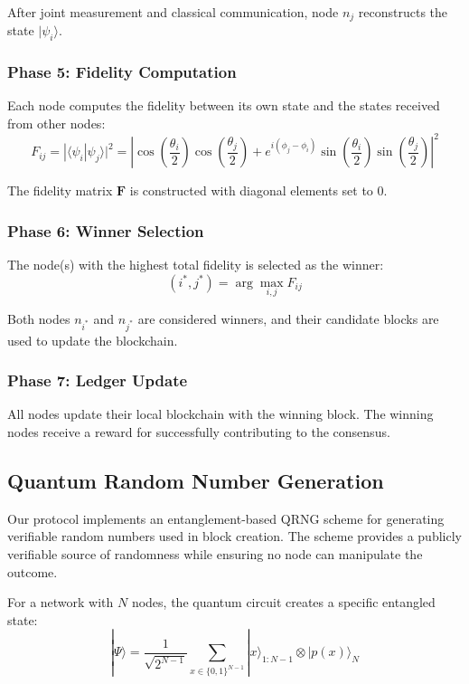 \documentclass[11pt,a4paper]{article}
\begin{document}
After joint measurement and classical communication, node $n_j$ reconstructs the state $|\psi_i\rangle$.

\subsubsection{Phase 5: Fidelity Computation}
Each node computes the fidelity between its own state and the states received from other nodes:
\begin{equation}
F_{ij} = |\langle\psi_i|\psi_j\rangle|^2 = \left|\cos\left(\frac{\theta_i}{2}\right)\cos\left(\frac{\theta_j}{2}\right) + e^{i(\phi_j-\phi_i)}\sin\left(\frac{\theta_i}{2}\right)\sin\left(\frac{\theta_j}{2}\right)\right|^2
\end{equation}

The fidelity matrix $\mathbf{F}$ is constructed with diagonal elements set to 0.

\subsubsection{Phase 6: Winner Selection}
The node(s) with the highest total fidelity is selected as the winner:
\begin{equation}
(i^*, j^*) = \arg\max_{i,j} F_{ij}
\end{equation}

Both nodes $n_{i^*}$ and $n_{j^*}$ are considered winners, and their candidate blocks are used to update the blockchain.

\subsubsection{Phase 7: Ledger Update}
All nodes update their local blockchain with the winning block. The winning nodes receive a reward for successfully contributing to the consensus.

\subsection{Quantum Random Number Generation}
Our protocol implements an entanglement-based QRNG scheme for generating verifiable random numbers used in block creation. The scheme provides a publicly verifiable source of randomness while ensuring no node can manipulate the outcome.

For a network with $N$ nodes, the quantum circuit creates a specific entangled state:
\begin{equation}
|\Psi\rangle = \frac{1}{\sqrt{2^{N-1}}}\sum_{x \in \{0,1\}^{N-1}} |x\rangle_{1:N-1} \otimes |p(x)\rangle_N
\end{equation}
\end{document}
